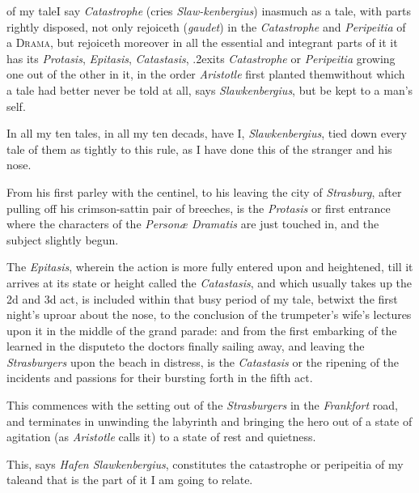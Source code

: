 \documentclass{article}
\begin{document}
\noindent
{}
of my tale\tsk I say \textit{Catastrophe} (cries
\textit{Slaw-\break kenbergius}) inasmuch as a
tale, with parts rightly disposed, not only rejoiceth
(\textit{gau\-det}) in the \textit{Catastrophe} and
\textit{Peripeitia} of\break
a \textsc{Drama}, but rejoiceth moreover in all the essential
and integrant parts of it\tsh\break
it has its \textit{Protasis}, \textit{Epitasis}, \textit{Catastasis},\break
\lower.2ex\hbox{i}ts \textit{Catastrophe} or
\textit{Peripeitia} growing one out of the other in it, in the order
\textit{Aristotle} first planted them\tsh without which a
tale had better never be told at all, says\break
\textit{Slawkenbergius}, but be kept to a man’s\break
self.

In all my ten tales, in all my ten de\-cads, have I,
\textit{Slawkenbergius}, tied down every tale of them as
tightly to this rule, as I have done this of the stranger and\break
his nose.

\tsk From his first parley with the centi\-nel, to his
leaving the city of \textit{Strasburg}, after pulling off his
crimson-sattin pair of breeches, is the \textit{Protasis} or first
entrance\break
\tsk where the characters of the \textit{Personæ
Dramatis} are just touched in, and the subject slightly
begun.

The \textit{Epitasis}, wherein the action is\break
more fully entered upon and heightened,\break
till it arrives at its state or height called
the \textit{Catastasis}, and which usually takes up the 2d and 3d
act, is included within that busy period of my tale, betwixt the
first night’s uproar about the nose, to the conclusion of the
trumpeter’s wife’s lectures upon it in the middle of
the grand parade: and from the first embarking of the learned in
the dispute\tsk to the doctors finally sailing away, and leaving
the \textit{Strasburgers} upon the beach in distress, is the
\textit{Catastasis} or the ripening of the incidents and passions for their bursting
forth in the fifth act.

This commences with the setting out of the \textit{Strasburgers}
in the \textit{Frankfort} road, and terminates in unwinding the
laby\-rinth and bringing the hero out of a state of agitation (as
\textit{Aristotle} calls it) to a state of rest and quietness.

This, says \textit{Hafen Slawkenbergius}, constitutes the
catastrophe or peripeitia of my tale\tsk and that
is the part of it I am going to relate.
\end{document}
